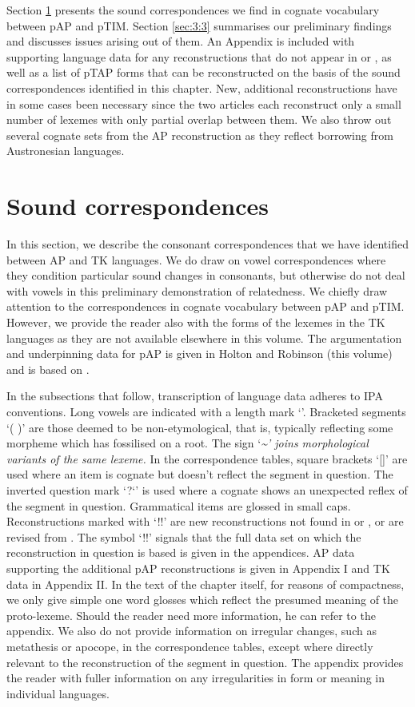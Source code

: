 \documentclass[output=paper]{LSP/langsci}
\begin{document}
Section \ref{sec:3:2} presents the sound correspondences we find in cognate vocabulary between pAP and pTIM. Section \ref{sec:3:3} summarises our preliminary findings and discusses issues arising out of them. An Appendix is included with supporting language data for any reconstructions that do not appear in \citet{HoltonEtAl2012} or \citet{SchapperEtAl2012}, as well as a list of pTAP forms that can be reconstructed on the basis of the sound correspondences identified in this chapter. New, additional reconstructions have in some cases been necessary since the two articles each reconstruct only a small number of lexemes with only partial overlap between them. We also throw out several cognate sets from the AP reconstruction as they reflect borrowing from Austronesian languages. 

\section{Sound correspondences}\label{sec:3:2}
In this section, we describe the consonant correspondences that we have identified between AP and TK languages. We do draw on vowel correspondences where they condition particular sound changes in consonants, but otherwise do not deal with vowels in this preliminary demonstration of relatedness. We chiefly draw attention to the correspondences in cognate vocabulary between pAP and pTIM. However, we provide the reader also with the forms of the lexemes in the TK languages as they are not available elsewhere in this volume. The argumentation and underpinning data for pAP is given in Holton and Robinson (this volume) and is based on \citet{HoltonEtAl2012}.

In the subsections that follow, transcription of language data adheres to IPA conventions. Long vowels are indicated with a length mark `{\textlengthmark}'. Bracketed segments `( )' are those deemed to be non-etymological, that is, typically reflecting some morpheme which has fossilised on a root. The sign `\emph{\textup{\~{}' joins morphological variants of the same lexeme. }}In the correspondence tables, square brackets `[]' are used where an item is cognate but doesn't reflect the segment in question. The inverted question mark `?`' is used where a cognate shows an unexpected reflex of the segment in question. Grammatical items are glossed in small caps. Reconstructions marked with `!!' are new reconstructions not found in \citet{HoltonEtAl2012} or \citet{SchapperEtAl2012}, or are revised from \citet{HoltonEtAl2012}. The symbol `!!' signals that the full data set on which the reconstruction in question is based is given in the appendices. AP data supporting the additional pAP reconstructions is given in 
Appendix I and TK data in Appendix II. In the text of the chapter itself, for reasons of compactness, we only give simple one word glosses which reflect the presumed meaning of the proto-lexeme. Should the reader need more information, he can refer to the appendix. We also do not provide information on irregular changes, such as metathesis or apocope, in the correspondence tables, except where directly relevant to the reconstruction of the segment in question. The appendix provides the reader with fuller information on any irregularities in form or meaning in individual languages. 
\end{document}
